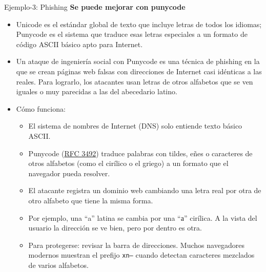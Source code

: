 \documentclass[aspectratio=169,11pt]{beamer}
\newcommand{\cyr}[1]{{\fontencoding{T2A}\fontfamily{cmss}\selectfont #1}}
\newcommand{\cmd}[1]{\texttt{\color{uznavy}#1}}
\newcommand{\lead}[1]{{\color{uznavy}\bfseries #1}\par\smallskip}
\begin{document}
\begin{frame}[allowframebreaks]{Ejemplo-3: Phishing}
\small
\lead{Se puede mejorar con punycode}
  \begin{itemize}
  \item Unicode es el estándar global de texto que incluye letras de todos los idiomas; Punycode es el sistema que traduce esas letras especiales a un formato de código ASCII básico apto para Internet.
  \item Un ataque de ingeniería social con Punycode es una técnica de phishing en la que se crean páginas web falsas con direcciones de Internet casi idénticas a las reales. Para lograrlo, los atacantes usan letras de otros alfabetos que se ven iguales o muy parecidas a las del abecedario latino.
  \item Cómo funciona:
    \begin{itemize}
    \item El sistema de nombres de Internet (DNS) solo entiende texto básico ASCII.
    \item Punycode (\href{https://www.rfc-editor.org/rfc/rfc3492}{RFC 3492}) traduce palabras con tildes, eñes o caracteres de otros alfabetos (como el cirílico o el griego) a un formato que el navegador pueda resolver.
    \item El atacante registra un dominio web cambiando una letra real por otra de otro alfabeto que tiene la misma forma.
    \item Por ejemplo, una ``a'' latina se cambia por una ``\cyr{а}'' cirílica. A la vista del usuario la dirección se ve bien, pero por dentro es otra.
    \item Para protegerse: revisar la barra de direcciones. Muchos navegadores modernos muestran el prefijo \cmd{xn--} cuando detectan caracteres mezclados de varios alfabetos.
    \end{itemize}
  \end{itemize}
\end{frame}
\end{document}
